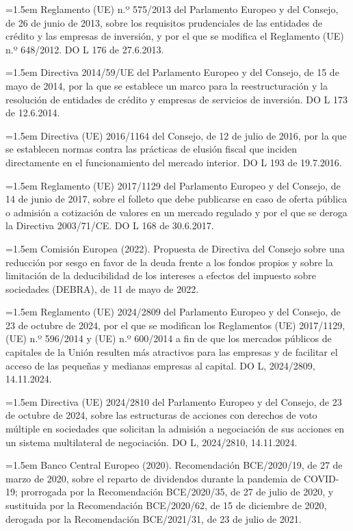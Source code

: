 \documentclass[10pt,a4paper]{article}
\begin{document}
\noindent\hangindent=1.5em Reglamento (UE) n.º 575/2013 del Parlamento Europeo y del Consejo, de 26 de junio de 2013, sobre los requisitos prudenciales de las entidades de crédito y las empresas de inversión, y por el que se modifica el Reglamento (UE) n.º 648/2012. DO L 176 de 27.6.2013.

\noindent\hangindent=1.5em Directiva 2014/59/UE del Parlamento Europeo y del Consejo, de 15 de mayo de 2014, por la que se establece un marco para la reestructuración y la resolución de entidades de crédito y empresas de servicios de inversión. DO L 173 de 12.6.2014.

\noindent\hangindent=1.5em Directiva (UE) 2016/1164 del Consejo, de 12 de julio de 2016, por la que se establecen normas contra las prácticas de elusión fiscal que inciden directamente en el funcionamiento del mercado interior. DO L 193 de 19.7.2016.

\noindent\hangindent=1.5em Reglamento (UE) 2017/1129 del Parlamento Europeo y del Consejo, de 14 de junio de 2017, sobre el folleto que debe publicarse en caso de oferta pública o admisión a cotización de valores en un mercado regulado y por el que se deroga la Directiva 2003/71/CE. DO L 168 de 30.6.2017.

\noindent\hangindent=1.5em Comisión Europea (2022). Propuesta de Directiva del Consejo sobre una reducción por sesgo en favor de la deuda frente a los fondos propios y sobre la limitación de la deducibilidad de los intereses a efectos del impuesto sobre sociedades (DEBRA), de 11 de mayo de 2022.

\noindent\hangindent=1.5em Reglamento (UE) 2024/2809 del Parlamento Europeo y del Consejo, de 23 de octubre de 2024, por el que se modifican los Reglamentos (UE) 2017/1129, (UE) n.º 596/2014 y (UE) n.º 600/2014 a fin de que los mercados públicos de capitales de la Unión resulten más atractivos para las empresas y de facilitar el acceso de las pequeñas y medianas empresas al capital. DO L, 2024/2809, 14.11.2024.

\noindent\hangindent=1.5em Directiva (UE) 2024/2810 del Parlamento Europeo y del Consejo, de 23 de octubre de 2024, sobre las estructuras de acciones con derechos de voto múltiple en sociedades que solicitan la admisión a negociación de sus acciones en un sistema multilateral de negociación. DO L, 2024/2810, 14.11.2024.

\noindent\hangindent=1.5em Banco Central Europeo (2020). Recomendación BCE/2020/19, de 27 de marzo de 2020, sobre el reparto de dividendos durante la pandemia de COVID-19; prorrogada por la Recomendación BCE/2020/35, de 27 de julio de 2020, y sustituida por la Recomendación BCE/2020/62, de 15 de diciembre de 2020, derogada por la Recomendación BCE/2021/31, de 23 de julio de 2021.
\end{document}
